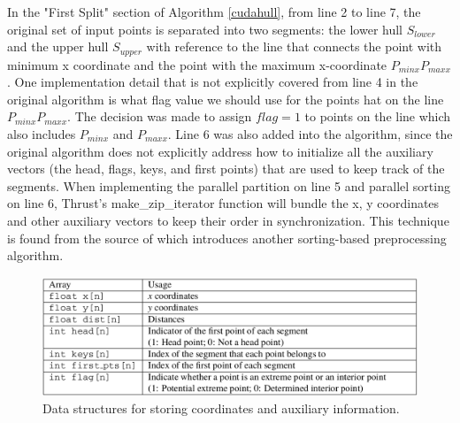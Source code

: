 \documentclass{article}
\begin{document}
In the "First Split" section of Algorithm \ref{cudahull}, from line 2 to line 7, the original set of input points is separated into two segments: the lower hull $S_{lower}$ and the upper hull $S_{upper}$ with reference to the line that connects the point with minimum x coordinate and the point with the maximum x-coordinate $P_{minx}P_{maxx}$. One implementation detail that is not explicitly covered from line 4 in the original algorithm is what flag value we should use for the points hat on the line $P_{minx}P_{maxx}$. The decision was made to assign $flag=1$ to points on the line which also includes $P_{minx}$ and $P_{maxx}$. Line 6 was also added into the algorithm, since the original algorithm does not explicitly address how to initialize all the auxiliary vectors (the head, flags, keys, and first points) that are used to keep track of the segments. When implementing the parallel partition on line 5 and parallel sorting on line 6, Thrust's make\_zip\_iterator function will bundle the x, y coordinates and other auxiliary vectors to keep their order in synchronization. This technique is found from the source of \cite{Mei_2016} which introduces another sorting-based preprocessing algorithm. \begin{figure}[H]
\centering
\includegraphics[scale=0.5]{images/cudatable.png}
\caption{Data structures for storing coordinates and auxiliary information. \cite{zhang2015novel}}
\label{cudadata}
\end{figure}
\end{document}
